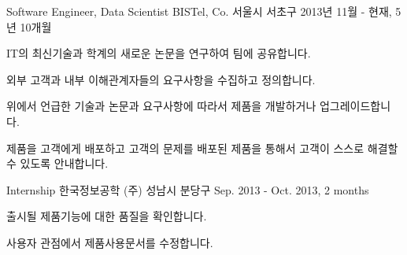 

\begin{cventries}

  \cventry
    {Software Engineer, Data Scientist} %
    {BISTel, Co.} %
    {서울시 서초구} %
    {2013년 11월 - 현재, 5년 10개월} %
    {
      \begin{cvitems} %
        \item {IT의 최신기술과 학계의 새로운 논문을 연구하여 팀에 공유합니다.}
        \item {외부 고객과 내부 이해관계자들의 요구사항을 수집하고 정의합니다.}
        \item {위에서 언급한 기술과 논문과 요구사항에 따라서 제품을 개발하거나 업그레이드합니다.}
        \item {제품을 고객에게 배포하고 고객의 문제를 배포된 제품을 통해서 고객이 스스로 해결할 수 있도록 안내합니다.}
      \end{cvitems}
    }

  \cventry
    {Internship} %
    {한국정보공학 (주)} %
    {성남시 분당구} %
    {Sep. 2013 - Oct. 2013, 2 months} %
    {
      \begin{cvitems} %
        \item {출시될 제품기능에 대한 품질을 확인합니다.}
        \item {사용자 관점에서 제품사용문서를 수정합니다.}
      \end{cvitems}
    }

\end{cventries}
